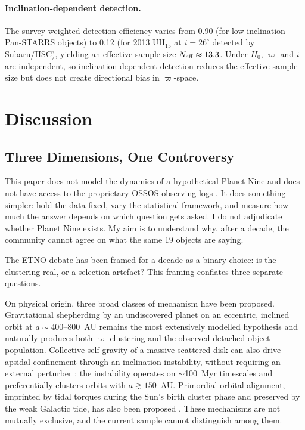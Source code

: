 \documentclass[usenatbib]{mnras}
\begin{document}
\paragraph{Inclination-dependent detection.}
The survey-weighted detection efficiency varies from 0.90 (for low-inclination Pan-STARRS objects) to 0.12 (for 2013 UH$_{15}$ at $i=26^\circ$ detected by Subaru/HSC), yielding an effective sample size $N_{\rm eff}\approx13.3$. Under $H_0$, $\varpi$ and $i$ are independent, so inclination-dependent detection reduces the effective sample size but does not create directional bias in $\varpi$-space.

\section{Discussion}

\subsection{Three Dimensions, One Controversy}

This paper does not model the dynamics of a hypothetical Planet Nine \citep{batygin2016,brown2019} and does not have access to the proprietary OSSOS observing logs \citep{shankman2017,napier2021}. It does something simpler: hold the data fixed, vary the statistical framework, and measure how much the answer depends on which question gets asked. I do not adjudicate whether Planet Nine exists. My aim is to understand why, after a decade, the community cannot agree on what the same 19 objects are saying.

The ETNO debate has been framed for a decade as a binary choice: is the clustering real, or a selection artefact? This framing conflates three separate questions.

On physical origin, three broad classes of mechanism have been proposed. Gravitational shepherding by an undiscovered planet on an eccentric, inclined orbit at $a\sim400$--800~AU \citep{batygin2016,brown2019,batygin2019,siraj2025} remains the most extensively modelled hypothesis and naturally produces both $\varpi$ clustering and the observed detached-object population. Collective self-gravity of a massive scattered disk can also drive apsidal confinement through an inclination instability, without requiring an external perturber \citep{madigan2018,zderic2020}; the instability operates on $\sim$100~Myr timescales and preferentially clusters orbits with $a\gtrsim150$~AU. Primordial orbital alignment, imprinted by tidal torques during the Sun's birth cluster phase and preserved by the weak Galactic tide, has also been proposed \citep{trujillo2014}. These mechanisms are not mutually exclusive, and the current sample cannot distinguish among them.
\end{document}
